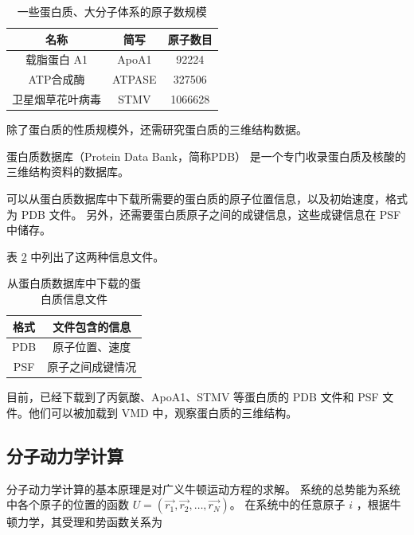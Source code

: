 \begin{table}[h]
    \centering
    \caption{一些蛋白质、大分子体系的原子数规模}
    \label{tab:protein-size}
    \begin{tabular}{ccc}
        \toprule
        名称       & 简写     & 原子数目    \\
        \midrule
        载脂蛋白 A1  & ApoA1  & 92224   \\
        ATP合成酶   & ATPASE & 327506  \\
        卫星烟草花叶病毒 & STMV   & 1066628 \\
        \bottomrule
    \end{tabular}
\end{table}

除了蛋白质的性质规模外，还需研究蛋白质的三维结构数据。

蛋白质数据库（Protein Data Bank，简称PDB）\cite{burley2017protein,sussman1998protein} 是一个专门收录蛋白质及核酸的三维结构资料的数据库。

可以从蛋白质数据库中下载所需要的蛋白质的原子位置信息，以及初始速度，格式为 PDB 文件。
另外，还需要蛋白质原子之间的成键信息，这些成键信息在 PSF 中储存。

表 \ref{tab:protein-files} 中列出了这两种信息文件。

\begin{table}[h]
    \centering
    \caption{从蛋白质数据库中下载的蛋白质信息文件}
    \label{tab:protein-files}
    \begin{tabular}{cc}
        \toprule
        格式  & 文件包含的信息  \\
        \midrule
        PDB & 原子位置、速度  \\
        PSF & 原子之间成键情况 \\
        \bottomrule
    \end{tabular}
\end{table}

目前，已经下载到了丙氨酸、ApoA1、STMV 等蛋白质的 PDB 文件和 PSF 文件。他们可以被加载到 VMD 中，观察蛋白质的三维结构。



\subsection{分子动力学计算}

分子动力学计算的基本原理是对广义牛顿运动方程的求解。
系统的总势能为系统中各个原子的位置的函数 $U = (\vec{r_1}, \vec{r_2}, \dots, \vec{r_N})$。
在系统中的任意原子 $i$ ，根据牛顿力学，其受理和势函数关系为


